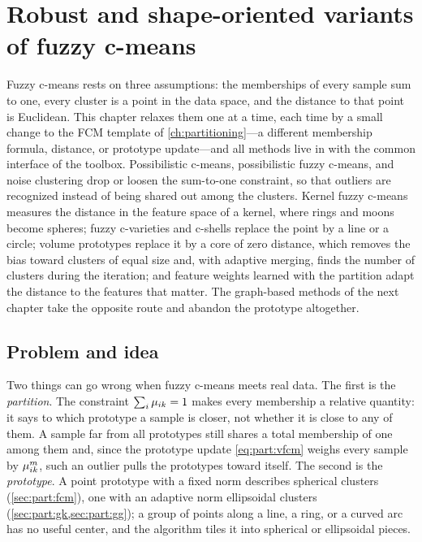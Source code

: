 \chapter[Robust and shape-oriented variants]{Robust and shape-oriented variants of fuzzy c-means}\label{ch:robust_shape}
\begin{roadmap}
Fuzzy c-means rests on three assumptions: the memberships of every sample sum to one, every cluster is a point in the data space, and the distance to that point is Euclidean. This chapter relaxes them one at a time, each time by a small change to the FCM template of \cref{ch:partitioning}---a different membership formula, distance, or prototype update---and all methods live in  with the common interface of the toolbox. Possibilistic c-means, possibilistic fuzzy c-means, and noise clustering drop or loosen the sum-to-one constraint, so that outliers are recognized instead of being shared out among the clusters. Kernel fuzzy c-means measures the distance in the feature space of a kernel, where rings and moons become spheres; fuzzy c-varieties and c-shells replace the point by a line or a circle; volume prototypes replace it by a core of zero distance, which removes the bias toward clusters of equal size and, with adaptive merging, finds the number of clusters during the iteration; and feature weights learned with the partition adapt the distance to the features that matter. The graph-based methods of the next chapter take the opposite route and abandon the prototype altogether.
\end{roadmap}

\section{Problem and idea}\label{sec:robust:problem}

Two things can go wrong when fuzzy c-means meets real data. The first is the \emph{partition}. The constraint $\sum_i\mu_{ik}=1$ makes every membership a relative quantity: it says to which prototype a sample is closer, not whether it is close to any of them. A sample far from all prototypes still shares a total membership of one among them and, since the prototype update \eqref{eq:part:vfcm} weighs every sample by $\mu_{ik}^m$, such an outlier pulls the prototypes toward itself. The second is the \emph{prototype}. A point prototype with a fixed norm describes spherical clusters (\cref{sec:part:fcm}), one with an adaptive norm ellipsoidal clusters (\cref{sec:part:gk,sec:part:gg}); a group of points along a line, a ring, or a curved arc has no useful center, and the algorithm tiles it into spherical or ellipsoidal pieces.

